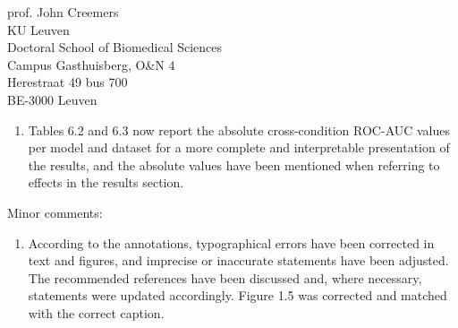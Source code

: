 \documentclass{letter}
\begin{document}
\begin{letter}{%
	prof. John Creemers \\
	KU Leuven \\
	Doctoral School of Biomedical Sciences \\
	Campus Gasthuisberg, O\&N 4 \\
	Herestraat 49 bus 700 \\
	BE-3000 Leuven

}
\begin{enumerate}
	  Since the MOABB benchmarking framework~\cite{Aristimunha2023} allows for
	  fair comparison of performance metrics reported across different works,
    the analyses for other comparison methods were not re-run by us (as
    reported).
    Instead, but performances were taken from the MOABB benchmark database~\cite{Chevallier2024}.
	  Unfortunately, this source provides only the aggregated performance metrics
	  and not the metrics per subject, session and cross-validation fold,
	  hence we could not perform relevant statistical comparison with these
	  comparison models.
  \item
    Tables 6.2 and 6.3 now report the absolute cross-condition ROC-AUC values
    per model and dataset for a more complete and interpretable presentation of
    the results, and the absolute values have been mentioned when referring to
    effects in the results section.
\end{enumerate}
Minor comments:
\begin{enumerate}
	\item According to the annotations, typographical errors have been
	corrected in text and figures, and imprecise or inaccurate statements have been adjusted.
	The recommended references have been discussed and, where necessary,
	statements were updated accordingly.
  Figure 1.5 was corrected and matched with the correct caption.
\end{enumerate}


\end{letter}
\end{document}

